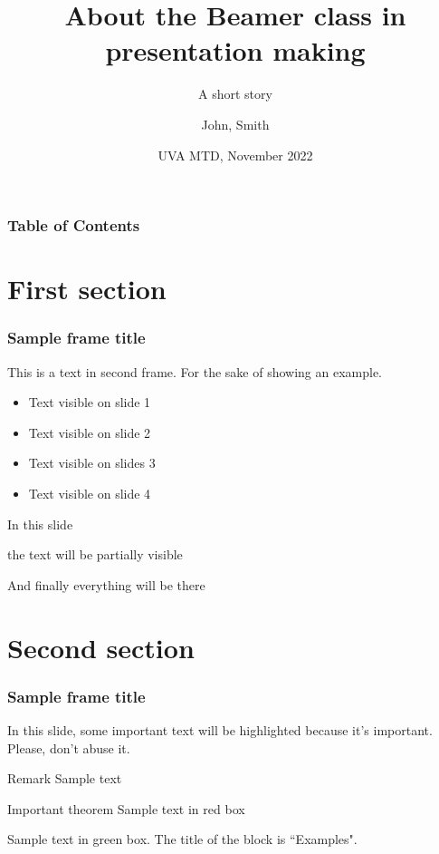 \documentclass[unknownkeysallowed,xcolor=dvipsnames]{beamer}
\title[About Beamer] %
{About the Beamer class in presentation making}
\subtitle{A short story}
\author[John, Smith] %
{John, Smith}
\institute[UVA] %
{
  University of Virginia
}
\date[UVA-] %
{UVA MTD, November 2022}
\begin{document}
\frame{\titlepage}


\begin{frame}
\frametitle{Table of Contents}
\tableofcontents
\end{frame}


\section{First section}

\begin{frame}
\frametitle{Sample frame title}
This is a text in second frame. For the sake of showing an example.

\begin{itemize}
    \item<1-> Text visible on slide 1
    \item<2-> Text visible on slide 2
    \item<3> Text visible on slides 3
    \item<4-> Text visible on slide 4
\end{itemize}
\end{frame}



\begin{frame}
In this slide \pause

the text will be partially visible \pause

And finally everything will be there
\end{frame}

\section{Second section}

\begin{frame}
\frametitle{Sample frame title}

In this slide, some important text will be
\alert{highlighted} because it's important.
Please, don't abuse it.

\begin{block}{Remark}
Sample text
\end{block}

\begin{alertblock}{Important theorem}
Sample text in red box
\end{alertblock}

\begin{examples}
Sample text in green box. The title of the block is ``Examples".
\end{examples}
\end{frame}
\end{document}
